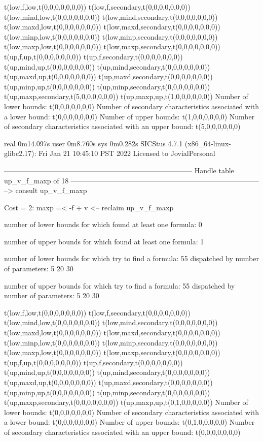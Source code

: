t(low,f,low,t(0,0,0,0,0,0,0))
t(low,f,secondary,t(0,0,0,0,0,0,0))
t(low,mind,low,t(0,0,0,0,0,0,0))
t(low,mind,secondary,t(0,0,0,0,0,0,0))
t(low,maxd,low,t(0,0,0,0,0,0,0))
t(low,maxd,secondary,t(0,0,0,0,0,0,0))
t(low,minp,low,t(0,0,0,0,0,0,0))
t(low,minp,secondary,t(0,0,0,0,0,0,0))
t(low,maxp,low,t(0,0,0,0,0,0,0))
t(low,maxp,secondary,t(0,0,0,0,0,0,0))
t(up,f,up,t(0,0,0,0,0,0,0))
t(up,f,secondary,t(0,0,0,0,0,0,0))
t(up,mind,up,t(0,0,0,0,0,0,0))
t(up,mind,secondary,t(0,0,0,0,0,0,0))
t(up,maxd,up,t(0,0,0,0,0,0,0))
t(up,maxd,secondary,t(0,0,0,0,0,0,0))
t(up,minp,up,t(0,0,0,0,0,0,0))
t(up,minp,secondary,t(0,0,0,0,0,0,0))
t(up,maxp,secondary,t(5,0,0,0,0,0,0))
t(up,maxp,up,t(1,0,0,0,0,0,0))
Number of lower bounds:                                             t(0,0,0,0,0,0,0)
Number of secondary characteristics associated with a lower bound:  t(0,0,0,0,0,0,0)
Number of upper bounds:                                             t(1,0,0,0,0,0,0)
Number of secondary characteristics associated with an upper bound: t(5,0,0,0,0,0,0)

real	0m14.097s
user	0m8.760s
sys	0m0.282s
SICStus 4.7.1 (x86_64-linux-glibc2.17): Fri Jan 21 10:45:10 PST 2022
Licensed to JovialPersonal


--------------------------------------------------------------------------------
Handle table up_v_f_maxp of 18
--------------------------------------------------------------------------------
--> consult up_v_f_maxp

Cost =  2:  maxp =< -f + v
<-- reclaim up_v_f_maxp

number of lower bounds for which found at least one formula: 0

number of upper bounds for which found at least one formula: 1

number of lower bounds for which try to find a formula: 55
dispatched by number of parameters: 5  20  30

number of upper bounds for which try to find a formula: 55
dispatched by number of parameters: 5  20  30

t(low,f,low,t(0,0,0,0,0,0,0))
t(low,f,secondary,t(0,0,0,0,0,0,0))
t(low,mind,low,t(0,0,0,0,0,0,0))
t(low,mind,secondary,t(0,0,0,0,0,0,0))
t(low,maxd,low,t(0,0,0,0,0,0,0))
t(low,maxd,secondary,t(0,0,0,0,0,0,0))
t(low,minp,low,t(0,0,0,0,0,0,0))
t(low,minp,secondary,t(0,0,0,0,0,0,0))
t(low,maxp,low,t(0,0,0,0,0,0,0))
t(low,maxp,secondary,t(0,0,0,0,0,0,0))
t(up,f,up,t(0,0,0,0,0,0,0))
t(up,f,secondary,t(0,0,0,0,0,0,0))
t(up,mind,up,t(0,0,0,0,0,0,0))
t(up,mind,secondary,t(0,0,0,0,0,0,0))
t(up,maxd,up,t(0,0,0,0,0,0,0))
t(up,maxd,secondary,t(0,0,0,0,0,0,0))
t(up,minp,up,t(0,0,0,0,0,0,0))
t(up,minp,secondary,t(0,0,0,0,0,0,0))
t(up,maxp,secondary,t(0,0,0,0,0,0,0))
t(up,maxp,up,t(0,1,0,0,0,0,0))
Number of lower bounds:                                             t(0,0,0,0,0,0,0)
Number of secondary characteristics associated with a lower bound:  t(0,0,0,0,0,0,0)
Number of upper bounds:                                             t(0,1,0,0,0,0,0)
Number of secondary characteristics associated with an upper bound: t(0,0,0,0,0,0,0)

